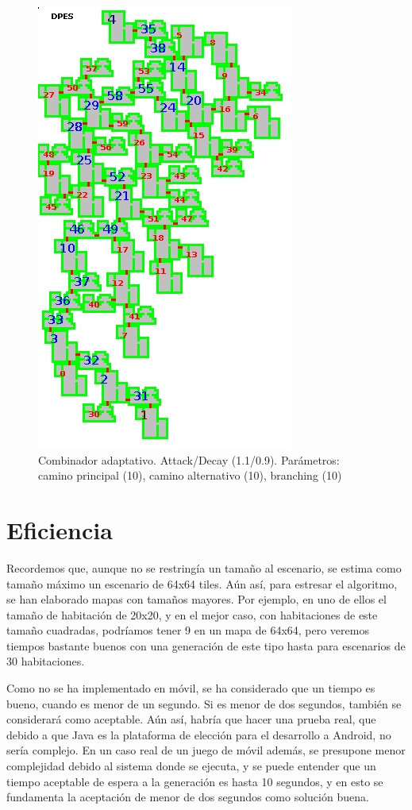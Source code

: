 \begin{figure}[H]
\centering
\includegraphics[scale=1]{img/mapsamples/adaptmainaltbranch2}
\caption{Combinador adaptativo. Attack/Decay (1.1/0.9). Parámetros: camino principal (10), camino alternativo (10), branching (10)
\label{fig:grfadaptmainaltbranch2}}
\end{figure}




\section{Eficiencia}

Recordemos que, aunque no se restringía un tamaño al escenario, se estima como tamaño máximo un escenario de 64x64 tiles. Aún así, para estresar el algoritmo, se han elaborado mapas con tamaños mayores. Por ejemplo, en uno de ellos el tamaño de habitación de 20x20, y en el mejor caso, con habitaciones de este tamaño cuadradas, podríamos tener 9 en un mapa de 64x64, pero veremos tiempos bastante buenos con una generación de este tipo hasta para escenarios de 30 habitaciones.

Como no se ha implementado en móvil, se ha considerado que un tiempo es bueno, cuando es menor de un segundo. Si es menor de dos segundos, también se considerará como aceptable. Aún así, habría que hacer una prueba real, que debido a que Java es la plataforma de elección para el desarrollo a Android, no sería complejo. En un caso real de un juego de móvil además, se presupone menor complejidad debido al sistema donde se ejecuta, y se puede entender que un tiempo aceptable de espera a la generación es hasta 10 segundos, y en esto se fundamenta la aceptación de menor de dos segundos como solución buena.

